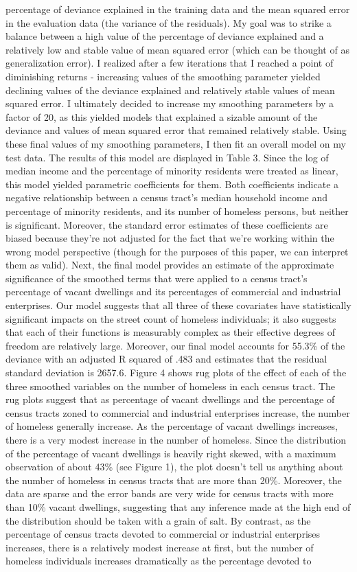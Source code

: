 \documentclass[titlepage]{article}   	%
\begin{document}
percentage of deviance explained in the training data and the mean squared error in the evaluation data (the variance of the residuals). My goal was to strike a balance between a high value of the percentage of deviance explained and a relatively low and stable value of mean squared error (which can be thought of as generalization error). I realized after a few iterations that I reached a point of diminishing returns - increasing values of the smoothing parameter yielded declining values of the deviance explained and relatively stable values of mean squared error. I ultimately decided to increase my smoothing parameters by a factor of 20, as this yielded models that explained a sizable amount of the deviance and values of mean squared error that remained relatively stable. Using these final values of my smoothing parameters, I then fit an overall model on my test data. The results of this model are displayed in Table 3. Since the log of median income and the percentage of minority residents were treated as linear, this model yielded parametric coefficients for them. Both coefficients indicate a negative relationship between a census tract’s median household income and percentage of minority residents, and its number of homeless persons, but neither is significant. Moreover, the standard error estimates of these coefficients are biased because they're not adjusted for the fact that we’re working within the wrong model perspective (though for the purposes of this paper, we can interpret them as valid). Next, the final model provides an estimate of the approximate significance of the smoothed terms that were applied to a census tract’s percentage of vacant dwellings and its percentages of commercial and industrial enterprises. Our model suggests that all three of these covariates have statistically significant impacts on the street count of homeless individuals; it also suggests that each of their functions is measurably complex as their effective degrees of freedom are relatively large. Moreover, our final model accounts for 55.3\% of the deviance with an adjusted R squared of .483 and estimates that the residual standard deviation is 2657.6. Figure 4 shows rug plots of the effect of each of the three smoothed variables on the number of homeless in each census tract. The rug plots suggest that as percentage of vacant dwellings and the percentage of census tracts zoned to commercial and industrial enterprises increase, the number of homeless generally increase. As the percentage of vacant dwellings increases, there is a very modest increase in the number of homeless. Since the distribution of the percentage of vacant dwellings is heavily right skewed, with a maximum observation of about 43\% (see Figure 1), the plot doesn’t tell us anything about the number of homeless in census tracts that are more than 20\%. Moreover, the data are sparse and the error bands are very wide for census tracts with more than 10\% vacant dwellings, suggesting that any inference made at the high end of the distribution should be taken with a grain of salt. By contrast, as the percentage of census tracts devoted to commercial or industrial enterprises increases, there is a relatively modest increase at first, but the number of homeless individuals increases dramatically as the percentage devoted to 
\end{document}
